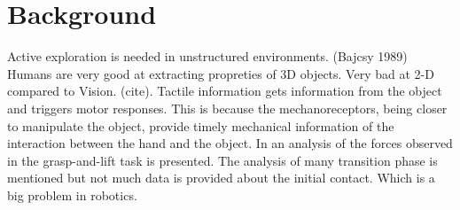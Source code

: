 \section{Background}
\label{sec:background}


Active exploration is needed in unstructured environments. (Bajcsy
1989) Humans are very good at extracting propreties of 3D objects.
Very bad at 2-D compared to Vision. (cite). Tactile information
gets information from the object and triggers motor responses.
This is because the mechanoreceptors, being closer to manipulate
the object, provide timely mechanical information of the
interaction between the hand and the
object\cite{Johansson90Liffiing}. In \cite{Johansson90Liffiing} an
analysis of the forces observed in the grasp-and-lift task is
presented. The analysis of many transition phase is mentioned but
not much data is provided about the initial contact. Which is a
big problem in robotics\cite{volpe90real}.





